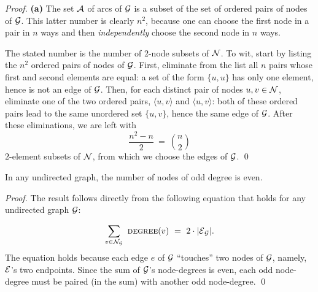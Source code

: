 \begin{proof}
{\bf (a)}
The set $\mbox{$\cal A$}$ of arcs of $\mbox{$\cal G$}$ is a subset of the set of ordered
pairs of nodes of $\mbox{$\cal G$}$.  This latter number is clearly $n^2$, because
one can choose the first node in a pair in $n$ ways and then {\em
  independently} choose the second node in $n$ ways.
\medskip

The stated number is the number of $2$-node subsets of $\mbox{$\cal N$}$.  To
wit, start by listing the $n^2$ ordered pairs of nodes of $\mbox{$\cal G$}$.
First, eliminate from the list all $n$ pairs whose first and second
elements are equal: a set of the form $\{ u,u\}$ has only one element,
hence is not an edge of $\mbox{$\cal G$}$.  Then, for each distinct pair of nodes
$u, v \in \mbox{$\cal N$}$, eliminate one of the two ordered pairs, $\langle
u,v \rangle$ and $\langle u,v \rangle$: both of these ordered pairs
lead to the same unordered set $\{ u,v\}$, hence the same edge of
$\mbox{$\cal G$}$.  After these eliminations, we are left with
\[ \frac{n^2 - n}{2} \ = \ {n \choose 2} \]
$2$-element subsets of $\mbox{$\cal N$}$, from which we choose the edges of
$\mbox{$\cal G$}$. \qed
\end{proof}


\begin{prop}
\label{thm:even-num-odd-degrees}
In any undirected graph, the number of nodes of odd degree is even.
\end{prop}

\begin{proof}
The result follows directly from the following equation that holds for
any undirected graph $\mbox{$\cal G$}$:

\[ \sum_{v \in {\cal N}_{\cal G}} \ \mbox{\sc degree}(v) \ = \ 2 \cdot
|\e_{\cal G}|.
\]
The equation holds because each edge $e$ of $\mbox{$\cal G$}$ ``touches'' two nodes
of $\mbox{$\cal G$}$, namely, $\mbox{$\cal E$}$'s two endpoints.  Since the sum of $\mbox{$\cal G$}$'s
node-degrees is even, each odd node-degree must be paired (in the sum)
with another odd node-degree.  \qed
\end{proof}

\medskip

